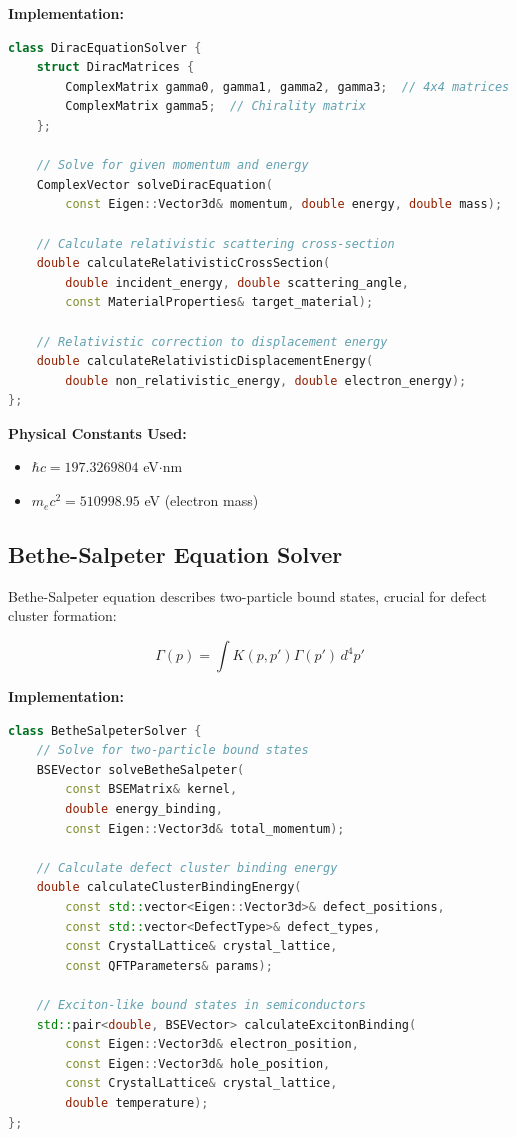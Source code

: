 \documentclass[11pt,a4paper]{article}
\begin{document}
\textbf{Implementation:}
\begin{lstlisting}[language=C++, basicstyle=\footnotesize\ttfamily]
class DiracEquationSolver {
    struct DiracMatrices {
        ComplexMatrix gamma0, gamma1, gamma2, gamma3;  // 4x4 matrices
        ComplexMatrix gamma5;  // Chirality matrix
    };

    // Solve for given momentum and energy
    ComplexVector solveDiracEquation(
        const Eigen::Vector3d& momentum, double energy, double mass);

    // Calculate relativistic scattering cross-section
    double calculateRelativisticCrossSection(
        double incident_energy, double scattering_angle,
        const MaterialProperties& target_material);

    // Relativistic correction to displacement energy
    double calculateRelativisticDisplacementEnergy(
        double non_relativistic_energy, double electron_energy);
};
\end{lstlisting}

\textbf{Physical Constants Used:}
\begin{itemize}
    \item $\hbar c = 197.3269804$ eV$\cdot$nm
    \item $m_e c^2 = 510998.95$ eV (electron mass)
\end{itemize}

\subsection{Bethe-Salpeter Equation Solver}

Bethe-Salpeter equation describes two-particle bound states, crucial for defect cluster formation:

\begin{equation}
\Gamma(p) = \int K(p, p') \Gamma(p') \, d^4p'
\end{equation}

\textbf{Implementation:}
\begin{lstlisting}[language=C++, basicstyle=\footnotesize\ttfamily]
class BetheSalpeterSolver {
    // Solve for two-particle bound states
    BSEVector solveBetheSalpeter(
        const BSEMatrix& kernel,
        double energy_binding,
        const Eigen::Vector3d& total_momentum);

    // Calculate defect cluster binding energy
    double calculateClusterBindingEnergy(
        const std::vector<Eigen::Vector3d>& defect_positions,
        const std::vector<DefectType>& defect_types,
        const CrystalLattice& crystal_lattice,
        const QFTParameters& params);

    // Exciton-like bound states in semiconductors
    std::pair<double, BSEVector> calculateExcitonBinding(
        const Eigen::Vector3d& electron_position,
        const Eigen::Vector3d& hole_position,
        const CrystalLattice& crystal_lattice,
        double temperature);
};
\end{lstlisting}
\end{document}
